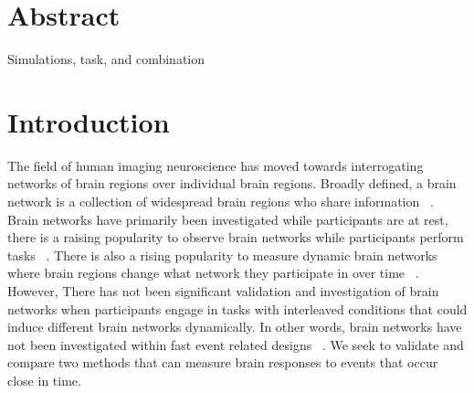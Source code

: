 \documentclass[10pt,letterpaper]{article}
\begin{document}
\section*{Abstract}
Simulations, task, and combination


\linenumbers

\section*{Introduction}
\label{intro}

The field of human imaging neuroscience has moved towards interrogating networks of brain regions
over individual brain regions.
Broadly defined, a brain network is a collection of widespread brain regions who share information ~\cite{Uddin2019}.
Brain networks have primarily been investigated while participants are at rest, there
is a raising popularity to observe brain networks while participants perform tasks ~\cite{Cole2014a}.
There is also a rising popularity to measure dynamic brain networks where brain regions change
what network they participate in over time ~\cite{Sakoglu2008,Hindriks2016}.
However, There has not been significant validation and investigation of brain networks
when participants engage in tasks with interleaved conditions that could induce
different brain networks dynamically.
In other words, brain networks have not been investigated within fast event related designs ~\cite{Buckner1998}.
We seek to validate and compare two methods that can measure brain responses to events that occur
close in time.
\end{document}
